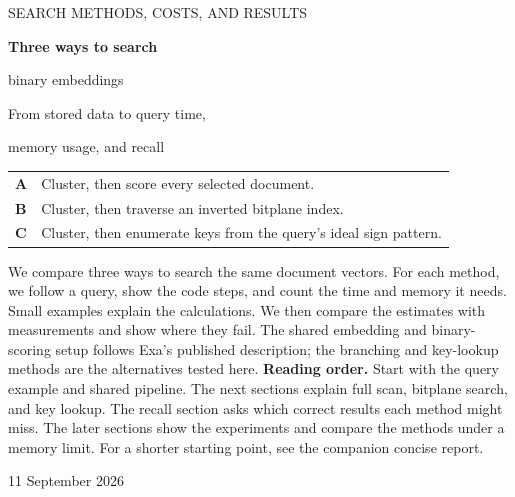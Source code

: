 \documentclass[11pt,a4paper]{article}
\begin{document}
\begin{titlepage}
\vspace*{14mm}
{\sffamily\small\color{Ink} SEARCH METHODS, COSTS, AND RESULTS}\par
\vspace{9mm}
{\Huge\bfseries\color{Ink} Three ways to search\par binary embeddings}\par
\vspace{6mm}
{\Large From stored data to query time,\par memory usage, and recall}\par
\vspace{15mm}
\begin{tabularx}{\linewidth}{@{}lY@{}}
\textbf{A} & Cluster, then score every selected document.\\[5pt]
\textbf{B} & Cluster, then traverse an inverted bitplane index.\\[5pt]
\textbf{C} & Cluster, then enumerate keys from the query's ideal sign pattern.\\
\end{tabularx}\par
\vspace{13mm}
We compare three ways to search the same document vectors. For each method, we follow a
query, show the code steps, and count the time and memory it needs. Small examples explain
the calculations. We then compare the estimates with measurements and show where they fail.
The shared embedding and binary-scoring setup follows Exa's published description; the
branching and key-lookup methods are the alternatives tested here.
\vfill
\textbf{Reading order.} Start with the query example and shared pipeline. The next sections
explain full scan, bitplane search, and key lookup. The recall section asks which correct
results each method might miss. The later sections show the experiments and compare the
methods under a memory limit. For a shorter starting point, see the companion concise report.
\vspace{8mm}
\par 11 September 2026
\end{titlepage}
\setcounter{tocdepth}{1}
\tableofcontents
\clearpage

\FloatBarrier
{}

\FloatBarrier
{}

\FloatBarrier
{}

\FloatBarrier
{}

\FloatBarrier
{}
\end{document}
